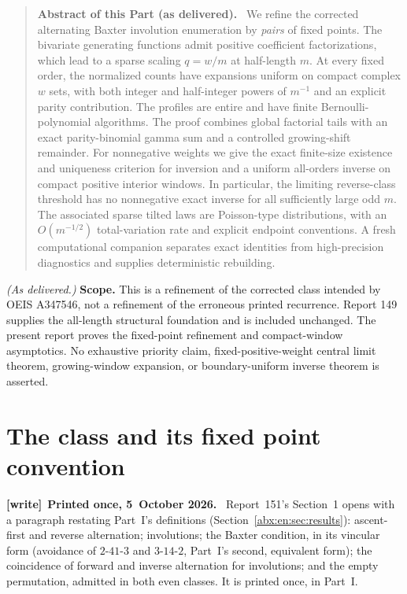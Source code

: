 \documentclass[11pt,letterpaper]{article}
\numberwithin{equation}{section}
\theoremstyle{remark}\newtheorem{remark}[theorem]{Remark}
\newenvironment{writenote}[1][]{\par\smallskip\begingroup\small
 \noindent\textbf{[write]}\if\relax\detokenize{#1}\relax\else~\textbf{#1.}\fi\ }%
 {\par\endgroup\smallskip}
\newenvironment{partabstract}{\begin{quote}\small\noindent\textbf{Abstract of this Part (as delivered).}\ }{\end{quote}}
\begin{document}
\begin{partabstract}
We refine the corrected alternating Baxter involution enumeration by
\emph{pairs} of fixed points. The bivariate generating functions admit
positive coefficient factorizations, which lead to a sparse scaling
$q=w/m$ at half-length $m$. At every fixed order, the normalized counts
have expansions uniform on compact complex $w$ sets, with both integer
and half-integer powers of $m^{-1}$ and an explicit parity contribution.
The profiles are entire and have finite Bernoulli-polynomial algorithms.
The proof combines global factorial tails with an exact parity-binomial
gamma sum and a controlled growing-shift remainder. For nonnegative
weights we give the exact finite-size existence and uniqueness criterion
for inversion and a uniform all-orders inverse on compact positive
interior windows. In particular, the limiting reverse-class threshold
has no nonnegative exact inverse for all sufficiently large odd $m$.
The associated sparse tilted laws are Poisson-type distributions, with
an $O(m^{-1/2})$ total-variation rate and explicit endpoint conventions.
A fresh computational companion separates exact identities from
high-precision diagnostics and supplies deterministic rebuilding.
\end{partabstract}
\noindent\emph{(As delivered.)} \textbf{Scope.} This is a refinement of the corrected class
intended by OEIS A347546, not a refinement of the erroneous printed
recurrence. Report 149 supplies the all-length structural foundation
and is included unchanged. The present report proves the fixed-point
refinement and compact-window asymptotics. No exhaustive priority
claim, fixed-positive-weight central limit theorem, growing-window
expansion, or boundary-uniform inverse theorem is asserted.

\section{The class and its fixed point convention}\label{abx:fp:sec:class}
\begin{writenote}[Printed once, 5~October 2026]
Report~151's Section~1 opens with a paragraph restating Part~I's definitions (Section~\ref{abx:en:sec:results}): ascent-first and reverse alternation; involutions; the Baxter condition, in its vincular form (avoidance of $2\text{-}41\text{-}3$ and $3\text{-}14\text{-}2$, Part~I's second, equivalent form); the coincidence of forward and inverse alternation for involutions; and the empty permutation, admitted in both even classes. It is printed once, in Part~I.
\end{writenote}
\end{document}
